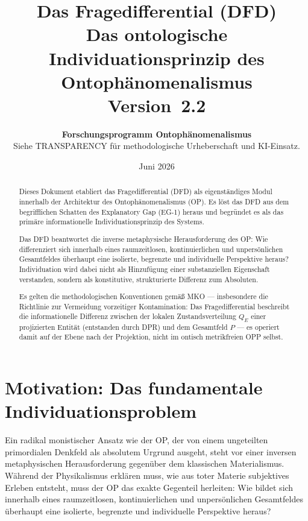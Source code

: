 \documentclass[11pt,a4paper]{article}
\title{
  \textbf{Das Fragedifferential (DFD)}\\[0.6em]
  \large Das ontologische Individuationsprinzip des Ontoph\"{a}nomenalismus\\[0.4em]
  {\normalsize Version~2.2}
}
\author{
  \textbf{Forschungsprogramm Ontoph\"{a}nomenalismus}\\
  \small Siehe TRANSPARENCY f\"{u}r methodologische Urheberschaft und KI-Einsatz.
}
\date{Juni 2026}
\theoremstyle{plain}
\theoremstyle{definition}
\begin{document}
\maketitle

\begin{abstract}
Dieses Dokument etabliert das Fragedifferential (DFD) als eigenst\"{a}ndiges Modul
innerhalb der Architektur des Ontoph\"{a}nomenalismus (OP). Es l\"{o}st das DFD aus
dem begrifflichen Schatten des Explanatory Gap (EG-1) heraus und begr\"{u}ndet es als
das prim\"{a}re informationelle Individuationsprinzip des Systems.

Das DFD beantwortet die inverse metaphysische Herausforderung des OP: Wie differenziert
sich innerhalb eines raumzeitlosen, kontinuierlichen und unpers\"{o}nlichen Gesamtfeldes
\"{u}berhaupt eine isolierte, begrenzte und individuelle Perspektive heraus? Individuation
wird dabei nicht als Hinzuf\"{u}gung einer substanziellen Eigenschaft verstanden, sondern
als konstitutive, strukturierte Differenz zum Absoluten.

Es gelten die methodologischen Konventionen gem\"{a}\ss{} MKO --- insbesondere die
Richtlinie zur Vermeidung vorzeitiger Kontamination: Das Fragedifferential beschreibt
die informationelle Differenz zwischen der lokalen Zustandsverteilung $Q_E$ einer
projizierten Entit\"{a}t (entstanden durch DPR) und dem Gesamtfeld $P$ --- es operiert
damit auf der Ebene nach der Projektion, nicht im ontisch metrikfreien OPP selbst.
\end{abstract}

\tableofcontents
\newpage

\section{Motivation: Das fundamentale Individuationsproblem}

Ein radikal monistischer Ansatz wie der OP, der von einem ungeteilten primordialen
Denkfeld als absolutem Urgrund ausgeht, steht vor einer inversen metaphysischen
Herausforderung gegen\"{u}ber dem klassischen Materialismus. W\"{a}hrend der
Physikalismus erkl\"{a}ren muss, wie aus toter Materie subjektives Erleben entsteht,
muss der OP das exakte Gegenteil herleiten: Wie bildet sich innerhalb eines
raumzeitlosen, kontinuierlichen und unpers\"{o}nlichen Gesamtfeldes \"{u}berhaupt eine
isolierte, begrenzte und individuelle Perspektive heraus?
\end{document}

